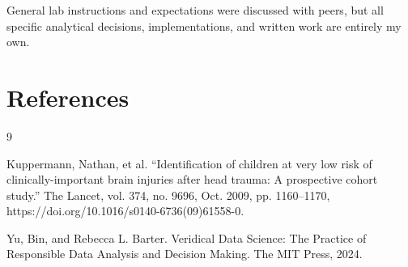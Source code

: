 \documentclass[11pt,letterpaper]{article}
\begin{document}
General lab instructions and expectations were discussed with peers, but all specific analytical decisions, implementations, and written work are entirely my own.

\section{References} 

\renewcommand{\refname}{\vspace{-2em}}
\begin{thebibliography}{9}
\addvspace{0.75em}

Kuppermann, Nathan, et al. “Identification of children at very low risk of clinically-important brain injuries after head trauma: A prospective cohort study.” The Lancet, vol. 374, no. 9696, Oct. 2009, pp. 1160–1170, https://doi.org/10.1016/s0140-6736(09)61558-0.

Yu, Bin, and Rebecca L. Barter. Veridical Data Science: The Practice of Responsible Data Analysis and Decision Making. The MIT Press, 2024.

\end{thebibliography}
\end{document}
